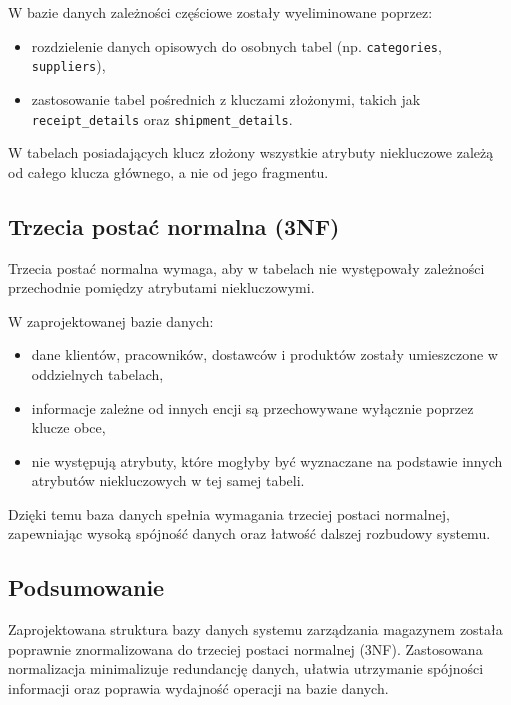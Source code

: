 W bazie danych zależności częściowe zostały wyeliminowane poprzez:
\begin{itemize}
    \item rozdzielenie danych opisowych do osobnych tabel (np. \texttt{categories}, \texttt{suppliers}),
    \item zastosowanie tabel pośrednich z kluczami złożonymi, takich jak
    \texttt{receipt\_details} oraz \texttt{shipment\_details}.
\end{itemize}

W tabelach posiadających klucz złożony wszystkie atrybuty niekluczowe
zależą od całego klucza głównego, a nie od jego fragmentu.

\subsection{Trzecia postać normalna (3NF)}

Trzecia postać normalna wymaga, aby w tabelach nie występowały zależności
przechodnie pomiędzy atrybutami niekluczowymi.

W zaprojektowanej bazie danych:
\begin{itemize}
    \item dane klientów, pracowników, dostawców i produktów zostały umieszczone
    w oddzielnych tabelach,
    \item informacje zależne od innych encji są przechowywane wyłącznie poprzez
    klucze obce,
    \item nie występują atrybuty, które mogłyby być wyznaczane na podstawie innych
    atrybutów niekluczowych w tej samej tabeli.
\end{itemize}

Dzięki temu baza danych spełnia wymagania trzeciej postaci normalnej,
zapewniając wysoką spójność danych oraz łatwość dalszej rozbudowy systemu.

\subsection{Podsumowanie}

Zaprojektowana struktura bazy danych systemu zarządzania magazynem
została poprawnie znormalizowana do trzeciej postaci normalnej (3NF).
Zastosowana normalizacja minimalizuje redundancję danych, ułatwia
utrzymanie spójności informacji oraz poprawia wydajność operacji
na bazie danych.
